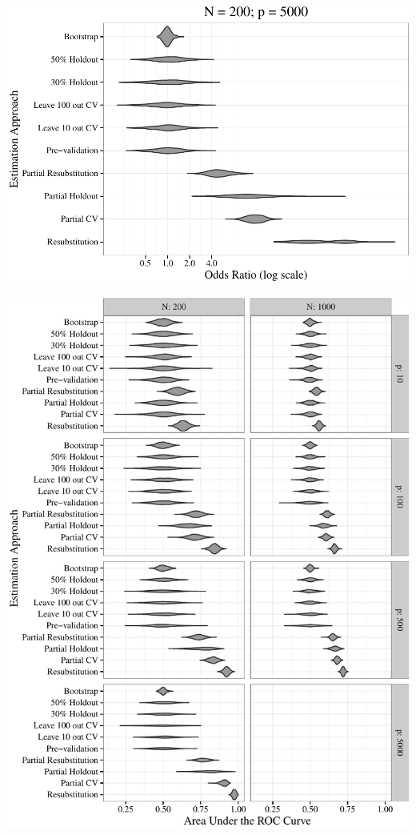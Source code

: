 \documentclass[11pt,]{article}
\begin{document}
\includegraphics{supplement_files/figure-latex/plots2-7.pdf} \clearpage

\includegraphics{supplement_files/figure-latex/overall-1.pdf}
\end{document}
